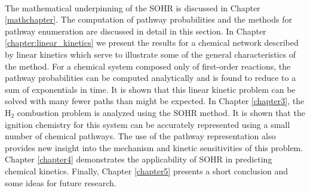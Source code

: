 \paragraph{}
The mathematical underpinning of the SOHR is discussed in Chapter \ref{mathchapter}. The computation
of pathway probabilities and the methods for pathway enumeration are discussed
in detail in this section. In Chapter \ref{chapter:linear_kinetics} we present the results for a chemical network
described by linear kinetics which serve to illustrate some of the general characteristics
of the method. For a chemical system composed only of first-order reactions, the pathway
probabilities can be computed analytically and is found to reduce to a sum of
exponentials in time. It is shown that this linear kinetic problem can be solved with
many fewer paths than might be expected. In Chapter \ref{chapter3}, the H$_2$
combustion problem is analyzed using the SOHR method. It is shown that the ignition
chemistry for this system can be accurately represented using a small number of chemical
pathways. The use of the pathway representation also provides new insight into the
mechanism and kinetic sensitivities of this problem. Chapter \ref{chapter4} demonstrates the applicability of SOHR in predicting chemical kinetics. Finally, Chapter \ref{chapter5} presents a short
conclusion and some ideas for future research.

